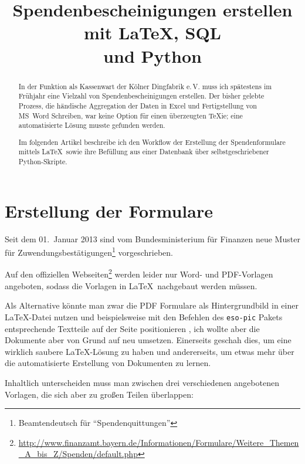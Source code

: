 \documentclass[ngerman]{dtk}%
\begin{document}
\title{Spendenbescheinigungen erstellen mit \LaTeX, SQL \\ und Python}


\maketitle


\begin{abstract}
In der Funktion als Kassenwart der Kölner Dingfabrik e.\,V. muss ich spätestens im Frühjahr eine Vielzahl von  Spendenbescheinigungen erstellen. Der bisher gelebte Prozess, die händische Aggregation der Daten in Excel und Fertigstellung von MS~Word Schreiben, war keine Option für einen überzeugten \TeX ie; eine automatisierte Lösung musste gefunden werden.

Im folgenden Artikel beschreibe ich den Workflow der Erstellung der Spendenformulare mittels \LaTeX\ sowie ihre Befüllung aus einer Datenbank über selbstgeschriebener Python-Skripte.
\end{abstract}

\section{Erstellung der Formulare}
Seit dem 01.~Januar 2013 sind vom Bundesministerium für Finanzen neue Muster für Zuwendungsbestätigungen\footnote{Beamtendeutsch für \enquote{Spendenquittungen}} vorgeschrieben.

Auf den offiziellen Webseiten\footnote{\url{http://www.finanzamt.bayern.de/Informationen/Formulare/Weitere_Themen_A_bis_Z/Spenden/default.php}}
werden leider nur Word- und PDF-Vorlagen angeboten, sodass die Vorlagen in \LaTeX\ nachgebaut werden müssen.

Als Alternative könnte man zwar die PDF Formulare als Hintergrundbild in einer \LaTeX-Datei nutzen und beispielsweise mit den Befehlen des \texttt{eso-pic} Pakets \cite{esopic} entsprechende Textteile auf der Seite positionieren \cite{forms}, ich wollte aber die Dokumente aber von Grund auf neu umsetzen.
Einerseits geschah dies, um eine wirklich saubere \LaTeX-Lösung zu haben und andererseits, um etwas mehr über die automatisierte Erstellung von Dokumenten zu lernen.

Inhaltlich unterscheiden muss man zwischen drei verschiedenen angebotenen Vorlagen, die sich aber zu großen Teilen überlappen:
\end{document}
